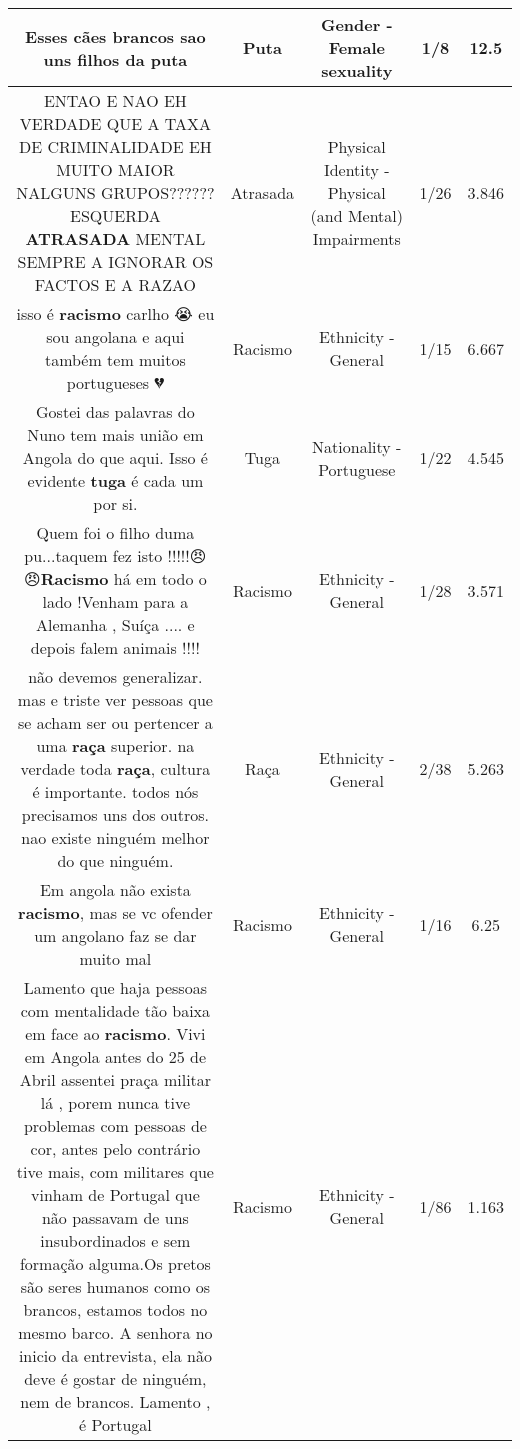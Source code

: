 \documentclass[11pt]{article}
\newlength\mylength
\begin{document}
\begin{center}
\begin{longtable}{|C{.65\mylength}|C{.30\mylength}|C{.12\mylength}|C{.12\mylength}|C{.12\mylength}|}
  \small Esses cães brancos sao uns filhos da puta\normalsize   & Puta & Gender - Female sexuality & 1/8 & 12.5 \\  \hline
  \small ENTAO E NAO EH VERDADE QUE A TAXA DE CRIMINALIDADE EH MUITO MAIOR NALGUNS GRUPOS?????? ESQUERDA \textbf{ATRASADA} MENTAL SEMPRE A IGNORAR OS FACTOS E A RAZAO\normalsize   & Atrasada & Physical Identity - Physical (and Mental) Impairments & 1/26 & 3.846 \\  \hline
  \small isso é \textbf{racismo}  carlho 😭 eu sou angolana  e aqui  também  tem  muitos portugueses 💔\normalsize   & Racismo & Ethnicity - General & 1/15 & 6.667 \\  \hline
  \small Gostei das palavras do Nuno tem mais união em Angola do que aqui. Isso é evidente \textbf{tuga} é cada um por si.\normalsize   & Tuga & Nationality - Portuguese & 1/22 & 4.545 \\  \hline
  \small Quem foi o filho duma pu...taquem fez isto !!!!!😠😠\textbf{Racismo} há em todo o lado !Venham para a Alemanha , Suíça .... e depois falem animais !!!!\normalsize   & Racismo & Ethnicity - General & 1/28 & 3.571 \\  \hline
  \small não devemos generalizar. mas e triste ver pessoas que se acham ser  ou pertencer  a uma \textbf{raça} superior. na verdade toda \textbf{raça}, cultura é importante. todos nós precisamos uns dos outros. nao existe ninguém melhor do que ninguém.\normalsize   & Raça & Ethnicity - General & 2/38 & 5.263 \\  \hline
  \small Em angola não exista \textbf{racismo},  mas se vc ofender um angolano faz se dar muito mal\normalsize   & Racismo & Ethnicity - General & 1/16 & 6.25 \\  \hline
  \small Lamento que haja pessoas com mentalidade tão baixa  em face ao \textbf{racismo}. Vivi em Angola antes do 25 de Abril assentei praça militar lá , porem nunca tive problemas com pessoas de cor, antes pelo contrário tive mais,  com militares que vinham de Portugal que não passavam de uns insubordinados  e sem formação alguma.Os pretos são seres humanos como os brancos, estamos todos no mesmo barco. A senhora no inicio da entrevista, ela não deve é gostar de ninguém, nem de brancos. Lamento , é Portugal\normalsize   & Racismo & Ethnicity - General & 1/86 & 1.163 \\  \hline

\end{longtable}
\end{center}
\end{document}
